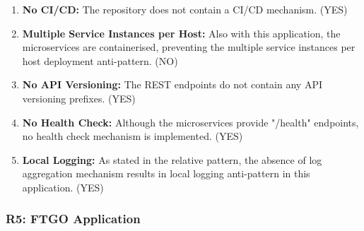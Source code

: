 \documentclass{Configuration_Files/PoliMi3i_thesis}
\begin{document}
\begin{enumerate}
    \item \textbf{No CI/CD:} The repository does not contain a CI/CD mechanism. (YES)
    
    \item \textbf{Multiple Service Instances per Host:} Also with this application, the microservices are containerised, preventing the multiple service instances per host deployment anti-pattern. (NO)
    
    \item \textbf{No API Versioning:} The REST endpoints do not contain any API versioning prefixes. (YES)
    
    \item \textbf{No Health Check:} Although the microservices provide "/health" endpoints, no health check mechanism is implemented. (YES)
    
    \item \textbf{Local Logging:} As stated in the relative pattern, the absence of log aggregation mechanism results in local logging anti-pattern in this application. (YES)
    
\end{enumerate}

\subsubsection{R5: FTGO Application}
\label{subsubsec:R5}
\end{document}
